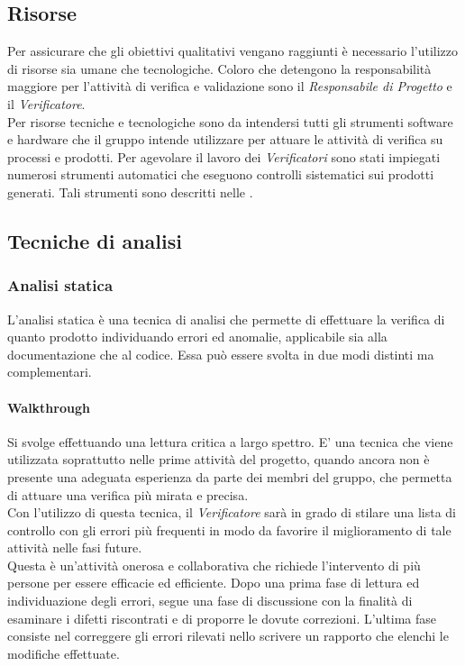 \subsection{Risorse}
Per assicurare che gli obiettivi qualitativi vengano raggiunti è necessario l'utilizzo di risorse sia umane che tecnologiche. Coloro che detengono la responsabilità maggiore per l'attività di verifica e validazione sono il \textit{Responsabile di Progetto} e il \textit{Verificatore}.\\
Per risorse tecniche e tecnologiche sono da intendersi tutti gli strumenti software e hardware che il gruppo intende utilizzare per attuare le attività di verifica su processi e prodotti. Per agevolare il lavoro dei \textit{Verificatori} sono stati impiegati numerosi strumenti automatici che eseguono controlli sistematici sui prodotti generati. Tali strumenti sono descritti nelle \textit{\NdP}.

\subsection{Tecniche di analisi}
\subsubsection{Analisi statica}
L'analisi statica è una tecnica di analisi che permette di effettuare la verifica di quanto prodotto individuando errori ed anomalie, applicabile sia alla documentazione che al codice. Essa può essere svolta in due modi distinti ma complementari.

\paragraph{Walkthrough}
Si svolge effettuando una lettura critica a largo spettro. E' una tecnica che viene utilizzata soprattutto nelle prime attività del progetto, quando ancora non è presente una adeguata esperienza da parte dei membri del gruppo, che permetta di attuare una verifica più mirata e precisa.\\
Con l'utilizzo di questa tecnica, il \textit{Verificatore} sarà in grado di stilare una lista di controllo con gli errori più frequenti in modo da favorire il miglioramento di tale attività nelle fasi future.\\
Questa è un'attività onerosa e collaborativa che richiede l'intervento di più persone per essere efficacie ed efficiente. Dopo una prima fase di lettura ed individuazione degli errori, segue una fase di discussione con la finalità di esaminare i difetti riscontrati e di proporre le dovute correzioni. L'ultima fase consiste nel correggere gli errori rilevati nello scrivere un rapporto che elenchi le modifiche effettuate.

